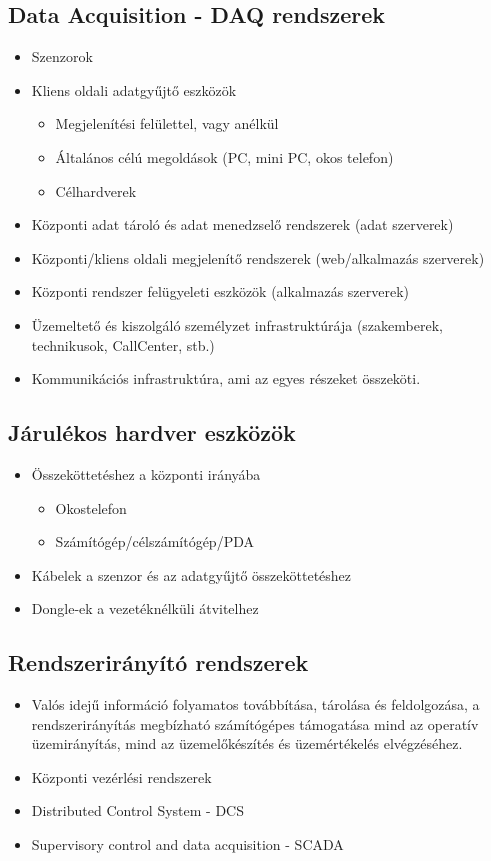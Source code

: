\subsection{Data Acquisition - DAQ rendszerek}
\begin{itemize}
    \item Szenzorok
    \item Kliens oldali adatgyűjtő eszközök
    \begin{itemize}
        \item Megjelenítési felülettel, vagy anélkül
        \item Általános célú megoldások (PC, mini PC, okos telefon)
        \item Célhardverek
    \end{itemize}
    \item Központi adat tároló és adat menedzselő rendszerek (adat szerverek)
    \item Központi/kliens oldali megjelenítő rendszerek (web/alkalmazás szerverek)
    \item Központi rendszer felügyeleti eszközök (alkalmazás szerverek)
    \item Üzemeltető és kiszolgáló személyzet infrastruktúrája (szakemberek, technikusok, CallCenter, stb.)
    \item Kommunikációs infrastruktúra, ami az egyes részeket összeköti.
\end{itemize}

\subsection{Járulékos hardver eszközök}
\begin{itemize}
    \item Összeköttetéshez a központi irányába
    \begin{itemize}
        \item Okostelefon
        \item Számítógép/célszámítógép/PDA
    \end{itemize}
    \item Kábelek a szenzor és az adatgyűjtő összeköttetéshez
    \item Dongle-ek a vezetéknélküli átvitelhez
\end{itemize}

\subsection{Rendszerirányító rendszerek}
\begin{itemize}
    \item Valós idejű információ folyamatos továbbítása, tárolása és feldolgozása, a rendszerirányítás megbízható számítógépes támogatása mind az operatív üzemirányítás, mind az üzemelőkészítés és üzemértékelés elvégzéséhez.
    \item Központi vezérlési rendszerek
    \item Distributed Control System - DCS
    \item Supervisory control and data acquisition - SCADA
\end{itemize}

